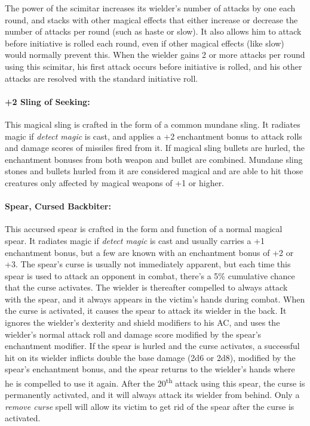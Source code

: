 \begin{multicols}{2}
The power of the scimitar increases its wielder's number of attacks by one each round, and stacks with other magical effects that either increase or decrease the number of attacks per round (such as haste or slow).   It also allows him to attack before initiative is rolled each round, even if other magical effects (like slow) would normally prevent this.  When the wielder gains 2 or more attacks per round using this scimitar, his first attack occurs before initiative is rolled, and his other attacks are resolved with the standard initiative roll.

\paragraph{+2 Sling of Seeking:} This magical sling is crafted in the form of a common mundane sling.  It radiates magic if \textit{detect magic} is cast, and applies a +2 enchantment bonus to attack rolls and damage scores of missiles fired from it.  If magical sling bullets are hurled, the enchantment bonuses from both weapon and bullet are combined.  Mundane sling stones and bullets hurled from it are considered magical and are able to hit those creatures only affected by magical weapons of +1 or higher.

 
\paragraph{Spear, Cursed Backbiter:} This accursed spear is crafted in the form and function of a normal magical spear.  It radiates magic if \textit{detect magic} is cast and usually carries a +1 enchantment bonus, but a few are known with an enchantment bonus of +2 or +3.  The spear's curse is usually not immediately apparent, but each time this spear is used to attack an opponent in combat, there's a 5\% cumulative chance that the curse activates.  The wielder is thereafter compelled to always attack with the spear, and it always appears in the victim's hands during combat.  When the curse is activated, it causes the spear to attack its wielder in the back.  It ignores the wielder's dexterity and shield modifiers to his AC, and uses the wielder's normal attack roll and damage score modified by the spear's enchantment modifier.  If the spear is hurled and the curse activates, a successful hit on its wielder inflicts double the base damage (2d6 or 2d8), modified by the spear's enchantment bonus, and the spear returns to the wielder's hands where he is compelled to use it again.  After the 20\textsuperscript{th} attack using this spear, the curse is permanently activated, and it will always attack its wielder from behind.  Only a \textit{remove curse} spell will allow its victim to get rid of the spear after the curse is activated.


\end{multicols}
